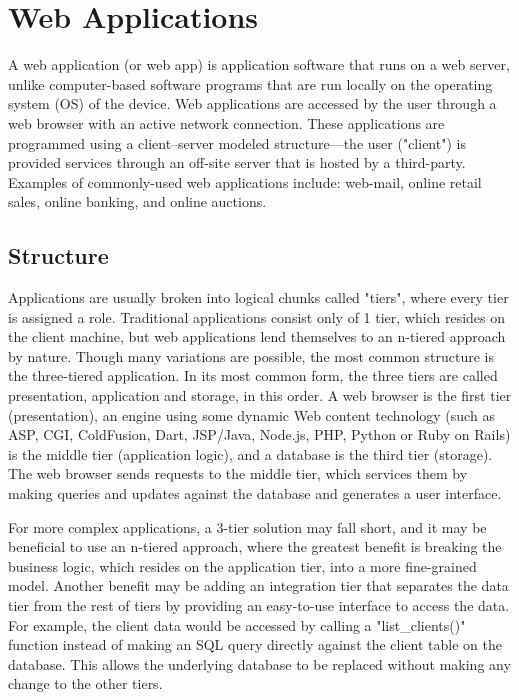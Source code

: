 \section{Web Applications}

A web application (or web app) is application software that runs on a web server, unlike computer-based software programs that are run locally on the operating system (OS) of the device. Web applications are accessed by the user through a web browser with an active network connection. These applications are programmed using a client–server modeled structure—the user ("client") is provided services through an off-site server that is hosted by a third-party. Examples of commonly-used web applications include: web-mail, online retail sales, online banking, and online auctions.

\subsection{Structure}

Applications are usually broken into logical chunks called "tiers", where every tier is assigned a role. Traditional applications consist only of 1 tier, which resides on the client machine, but web applications lend themselves to an n-tiered approach by nature. Though many variations are possible, the most common structure is the three-tiered application.\cite{krunalMakeNtierArchitecture2008} In its most common form, the three tiers are called presentation, application and storage, in this order. A web browser is the first tier (presentation), an engine using some dynamic Web content technology (such as ASP, CGI, ColdFusion, Dart, JSP/Java, Node.js, PHP, Python or Ruby on Rails) is the middle tier (application logic), and a database is the third tier (storage). The web browser sends requests to the middle tier, which services them by making queries and updates against the database and generates a user interface.

For more complex applications, a 3-tier solution may fall short, and it may be beneficial to use an n-tiered approach, where the greatest benefit is breaking the business logic, which resides on the application tier, into a more fine-grained model.\cite{krunalMakeNtierArchitecture2008} Another benefit may be adding an integration tier that separates the data tier from the rest of tiers by providing an easy-to-use interface to access the data. For example, the client data would be accessed by calling a "list\_clients()" function instead of making an SQL query directly against the client table on the database. This allows the underlying database to be replaced without making any change to the other tiers.

